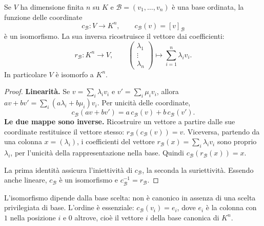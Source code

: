 \begin{teorema}
Se $V$ ha dimensione finita $n$ su $K$ e $\mathcal B=(v_1,\ldots,v_n)$ è una base ordinata, la funzione delle coordinate
\[
 c_{\mathcal B}:V\longrightarrow K^n,\qquad
 c_{\mathcal B}(v)=[v]_{\mathcal B}
\]
è un isomorfismo. La sua inversa ricostruisce il vettore dai coefficienti:
\[
 r_{\mathcal B}:K^n\longrightarrow V,\qquad
 \begin{pmatrix}\lambda_1\\\vdots\\\lambda_n\end{pmatrix}
 \longmapsto\sum_{i=1}^n\lambda_iv_i.
\]
In particolare $V$ è isomorfo a $K^n$.
\end{teorema}
\begin{proof}
\textbf{Linearità.} Se $v=\sum_i\lambda_iv_i$ e $v'=\sum_i\mu_iv_i$, allora $av+bv'=\sum_i(a\lambda_i+b\mu_i)v_i$. Per unicità delle coordinate,
\[
 c_{\mathcal B}(av+bv')=a\,c_{\mathcal B}(v)+b\,c_{\mathcal B}(v').
\]
\textbf{Le due mappe sono inverse.} Ricostruire un vettore a partire dalle sue coordinate restituisce il vettore stesso: $r_{\mathcal B}(c_{\mathcal B}(v))=v$. Viceversa, partendo da una colonna $x=(\lambda_i)$, i coefficienti del vettore $r_{\mathcal B}(x)=\sum_i\lambda_iv_i$ sono proprio $\lambda_i$, per l'unicità della rappresentazione nella base. Quindi $c_{\mathcal B}(r_{\mathcal B}(x))=x$.

La prima identità assicura l'iniettività di $c_{\mathcal B}$, la seconda la suriettività. Essendo anche lineare, $c_{\mathcal B}$ è un isomorfismo e $c_{\mathcal B}^{-1}=r_{\mathcal B}$.
\end{proof}
\begin{schema}
\end{schema}
L'isomorfismo dipende dalla base scelta: non è canonico in assenza di una scelta privilegiata di base. L'ordine è essenziale: $c_{\mathcal B}(v_i)=e_i$, dove $e_i$ è la colonna con $1$ nella posizione $i$ e $0$ altrove, cioè il vettore $i$ della base canonica di $K^n$.

